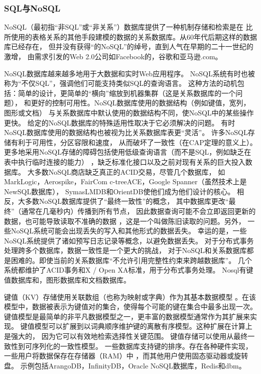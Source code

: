 \subsubsection{SQL与NoSQL}
NoSQL（最初指“非SQL”或“非关系”）数据库提供了一种机制存储和检索是在
比所使用的表格关系的其他手段建模的数据的关系数据库。从60年代后期这样的数据库已经存在，
但并没有获得“的NoSQL”的绰号，直到人气在早期的二十一世纪的激增，
由需求引发的Web 2.0公司如Facebook的，谷歌和亚马逊.com。

 NoSQL数据库越来越多地用于大数据和实时Web应用程序。
 NoSQL系统有时也被称为“不仅SQL”，强调他们可能支持类似SQL的查询语言。
这种方法的动机包括：简单的设计，更简单的“横向”缩放到机器集群（这是关系数据库的一个问题），
和更好的控制可用性。NoSQL数据库使用的数据结构（例如键值，宽列，图形或文档）
与关系数据库中默认使用的数据结构不同，使NoSQL中的某些操作更快。
给定的NoSQL数据库的特殊适用性取决于它必须解决的问题。
有时NoSQL数据库使用的数据结构也被视为比关系数据库表更“灵活”。
许多NoSQL存储有利于可用性，分区容限和速度，
从而破坏了一致性（在CAP定理的意义上）。
更多地采用NoSQL存储的障碍包括使用低级查询语言（而不是SQL，例如缺乏在表中执行临时连接的能力）
，缺乏标准化接口以及之前对现有关系的巨大投入数据库。
大多数NoSQL商店缺乏真正的ACID交易，尽管几个数据库，
如MarkLogic，Aerospike，FairCom c-treeACE，Google Spanner（虽然技术上是NewSQL数据库），
SymasLMDB和OrientDB使他们成为他们设计的核心。
相反，大多数NoSQL数据库提供了“最终一致性”的概念，
其中数据库更改“最终”（通常在几毫秒内）传播到所有节点，
因此数据查询可能不会立即返回更新的数据，也可能导致读取不准确的数据
，这是一个叫做陈旧读取的问题。另外，
一些NoSQL系统可能会出现丢失的写入和其他形式的数据丢失。
幸运的是，一些NoSQL系统提供了诸如预写日志记录等概念，以避免数据丢失。
对于分布式事务处理跨多个数据库，数据一致性是一个更大的挑战，
对于NoSQL和关系数据库都是困难的。即使当前的关系数据库“不允许引用完整性约束来跨越数据库”。
几个系统都维护了ACID事务和X / Open XA标准，用于分布式事务处理。
Nosql有键值数据库和，图形数据库和文档数据库。

键值（KV）存储使用关联数组（也称为映射或字典）作为其基本数据模型
。在该模型中，数据被表示为键值对的集合，使得每个可能的键在集合中最多出现一次。
键值模型是最简单的非平凡数据模型之一，更丰富的数据模型通常作为其扩展来实现。
键值模型可以扩展到以词典顺序维护键的离散有序模型。这种扩展在计算上是强大的，
因为它可以有效地检索选择性关键范围。
键值存储可以使用从最终一致性到可序列化的一致性模型。
一些数据库支持键的排序。存在各种硬件实现，一些用户将数据保存在存储器（RAM）中
，而其他用户使用固态驱动器或旋转盘。
示例包括ArangoDB，InfinityDB，Oracle NoSQL数据库，Redis和dbm。

